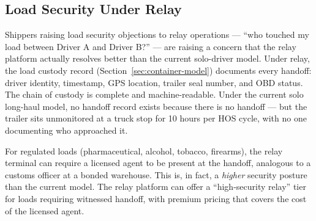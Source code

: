 \subsection{Load Security Under Relay}

Shippers raising load security objections to relay operations --- ``who touched my load between Driver A and Driver B?'' --- are raising a concern that the relay platform actually resolves better than the current solo-driver model. Under relay, the load custody record (Section~\ref{sec:container-model}) documents every handoff: driver identity, timestamp, GPS location, trailer seal number, and OBD status. The chain of custody is complete and machine-readable. Under the current solo long-haul model, no handoff record exists because there is no handoff --- but the trailer sits unmonitored at a truck stop for 10 hours per HOS cycle, with no one documenting who approached it.

For regulated loads (pharmaceutical, alcohol, tobacco, firearms), the relay terminal can require a licensed agent to be present at the handoff, analogous to a customs officer at a bonded warehouse. This is, in fact, a \textit{higher} security posture than the current model. The relay platform can offer a ``high-security relay'' tier for loads requiring witnessed handoff, with premium pricing that covers the cost of the licensed agent.
